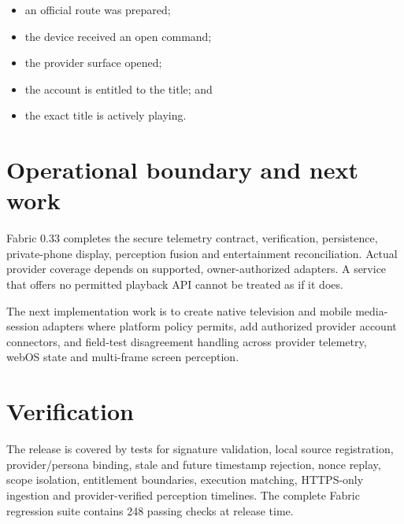 \documentclass[11pt,a4paper]{article}
\begin{document}
\begin{itemize}
  \item an official route was prepared;
  \item the device received an open command;
  \item the provider surface opened;
  \item the account is entitled to the title; and
  \item the exact title is actively playing.
\end{itemize}

\section{Operational boundary and next work}

Fabric 0.33 completes the secure telemetry contract, verification, persistence,
private-phone display, perception fusion and entertainment reconciliation.
Actual provider coverage depends on supported, owner-authorized adapters. A
service that offers no permitted playback API cannot be treated as if it does.

The next implementation work is to create native television and mobile media-
session adapters where platform policy permits, add authorized provider account
connectors, and field-test disagreement handling across provider telemetry,
webOS state and multi-frame screen perception.

\section{Verification}

The release is covered by tests for signature validation, local source
registration, provider/persona binding, stale and future timestamp rejection,
nonce replay, scope isolation, entitlement boundaries, execution matching,
HTTPS-only ingestion and provider-verified perception timelines. The complete
Fabric regression suite contains 248 passing checks at release time.
\end{document}
